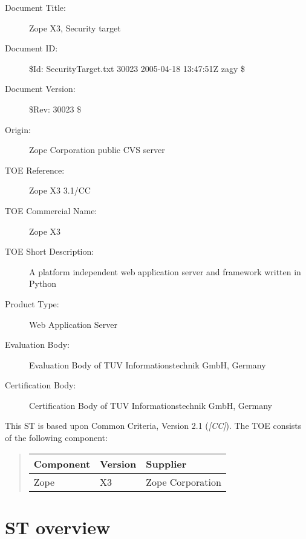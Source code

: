 \documentclass[12pt,english]{scrbook}
\begin{document}
\begin{description}
\item [Document Title:]
Zope X3, Security target


\item [Document ID:]
{\$}Id: SecurityTarget.txt 30023 2005-04-18 13:47:51Z zagy {\$}


\item [Document Version:]
{\$}Rev: 30023 {\$}


\item [Origin:]
Zope Corporation public CVS server


\item [TOE Reference:]
Zope X3 3.1/CC


\item [TOE Commercial Name:]
Zope X3


\item [TOE Short Description:]
A platform independent web application server and framework written in Python


\item [Product Type:]
Web Application Server


\item [Evaluation Body:]
Evaluation Body of TUV Informationstechnik GmbH, Germany


\item [Certification Body:]
Certification Body of TUV Informationstechnik GmbH, Germany


\end{description}

This ST is based upon Common Criteria, Version 2.1 (\emph{{[}CC]}).
The TOE consists of the following component:
\begin{quote}

\begin{longtable}[c]{|l|l|l|}
\hline
\textbf{
Component
} & \textbf{
Version
} & \textbf{
Supplier
} \\
\hline
\endhead

Zope
 & 
X3
 & 
Zope Corporation
 \\
\hline
\end{longtable}
\end{quote}





\section{ST overview}
\end{document}
